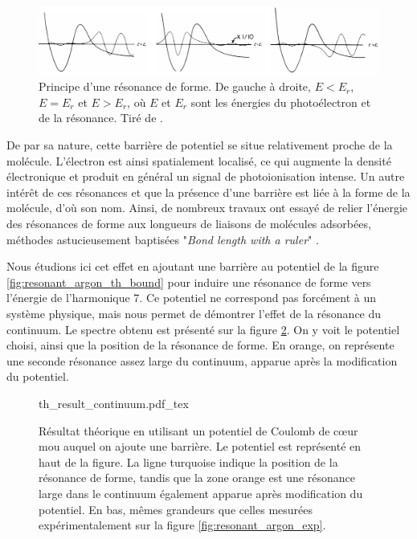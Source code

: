 \begin{figure}[!ht]
\centering
\includegraphics[width=1\columnwidth]{Figures/ResonantArgon/shape_resonance.pdf}%
\caption{Principe d'une résonance de forme. De gauche à droite, $E<E_r$, $E=E_r$ et $E>E_r$, où $E$ et $E_r$ sont les énergies du photoélectron et de la résonance. Tiré de .}
\label{fig:shaperesonance}
\end{figure}

De par sa nature, cette barrière de potentiel se situe relativement proche de la molécule. L'électron est ainsi spatialement localisé, ce qui augmente la densité électronique et produit en général un signal de photoionisation intense. Un autre intérêt de ces résonances et que la présence d'une barrière est liée à la forme de la molécule, d'où son nom. Ainsi, de nombreux travaux ont essayé de relier l'énergie des résonances de forme aux longueurs de liaisons de molécules adsorbées, méthodes astucieusement baptisées "\textit{Bond length with a ruler}" .

Nous étudions ici cet effet en ajoutant une barrière au potentiel de la figure \ref{fig:resonant_argon_th_bound} pour induire une résonance de forme vers l'énergie de l'harmonique 7. Ce potentiel ne correspond pas forcément à un système physique, mais nous permet de démontrer l'effet de la résonance du continuum. Le spectre obtenu est présenté sur la figure \ref{fig:resonant_argon_th_continuum}. On y voit le potentiel choisi, ainsi que la position de la résonance de forme. En orange, on représente une seconde résonance assez large du continuum, apparue après la modification du potentiel.

\begin{figure}[!ht]
\centering
\def\svgwidth{1\columnwidth}
{th_result_continuum.pdf_tex}
\caption{Résultat théorique en utilisant un potentiel de Coulomb de cœur mou auquel on ajoute une barrière. Le potentiel est représenté en haut de la figure. La ligne turquoise indique la position de la résonance de forme, tandis que la zone orange est une résonance large dans le continuum également apparue après modification du potentiel. En bas, mêmes grandeurs que celles mesurées expérimentalement sur la figure \ref{fig:resonant_argon_exp}.}
\label{fig:resonant_argon_th_continuum}
\end{figure}


